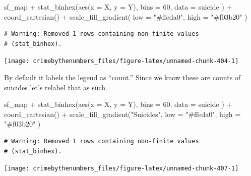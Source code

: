 \documentclass[
  a4paper,
]{krantz}
\makeatletter
\newenvironment{Shaded}{\begin{snugshade}}{\end{snugshade}}
\newcommand{\AttributeTok}[1]{\textcolor[rgb]{0.61,0.61,0.61}{#1}}
\newcommand{\DecValTok}[1]{\textcolor[rgb]{0.06,0.06,0.06}{#1}}
\newcommand{\FunctionTok}[1]{\textcolor[rgb]{0,0,0}{#1}}
\newcommand{\NormalTok}[1]{#1}
\newcommand{\SpecialCharTok}[1]{\textcolor[rgb]{0,0,0}{#1}}
\newcommand{\StringTok}[1]{\textcolor[rgb]{0.5,0.5,0.5}{#1}}
\newenvironment{kframe}{%
\medskip{}
\setlength{\fboxsep}{.8em}
 \def\at@end@of@kframe{}%
 \ifinner\ifhmode%
  \def\at@end@of@kframe{\end{minipage}}%
  \begin{minipage}{\columnwidth}%
 \fi\fi%
 \def\FrameCommand##1{\hskip\@totalleftmargin \hskip-\fboxsep
 \colorbox{shadecolor}{##1}\hskip-\fboxsep
     \hskip-\linewidth \hskip-\@totalleftmargin \hskip\columnwidth}%
 \MakeFramed {\advance\hsize-\width
   \@totalleftmargin\z@ \linewidth\hsize
   \@setminipage}}%
 {\par\unskip\endMakeFramed%
 \at@end@of@kframe}
\renewenvironment{Shaded}{\begin{kframe}}{\end{kframe}}
\makeatother
\begin{document}
\begin{Shaded}
\begin{Highlighting}[]
\NormalTok{sf\_map }\SpecialCharTok{+}
  \FunctionTok{stat\_binhex}\NormalTok{(}\FunctionTok{aes}\NormalTok{(}\AttributeTok{x =}\NormalTok{ X, }\AttributeTok{y =}\NormalTok{ Y),}
    \AttributeTok{bins =} \DecValTok{60}\NormalTok{,}
    \AttributeTok{data =}\NormalTok{ suicide}
\NormalTok{  ) }\SpecialCharTok{+}
  \FunctionTok{coord\_cartesian}\NormalTok{() }\SpecialCharTok{+}
  \FunctionTok{scale\_fill\_gradient}\NormalTok{(}
    \AttributeTok{low =} \StringTok{"\#ffeda0"}\NormalTok{,}
    \AttributeTok{high =} \StringTok{"\#f03b20"}
\NormalTok{  )}
\end{Highlighting}
\end{Shaded}

\begin{verbatim}
# Warning: Removed 1 rows containing non-finite values
# (stat_binhex).
\end{verbatim}

\begin{center}\texttt{[image: crimebythenumbers\_files/figure-latex/unnamed-chunk-404-1]} \end{center}

By default it labels the legend as ``count.'' Since we know
these are counts of suicides let's relabel that as such.

\begin{Shaded}
\begin{Highlighting}[]
\NormalTok{sf\_map }\SpecialCharTok{+}
  \FunctionTok{stat\_binhex}\NormalTok{(}\FunctionTok{aes}\NormalTok{(}\AttributeTok{x =}\NormalTok{ X, }\AttributeTok{y =}\NormalTok{ Y),}
    \AttributeTok{bins =} \DecValTok{60}\NormalTok{,}
    \AttributeTok{data =}\NormalTok{ suicide}
\NormalTok{  ) }\SpecialCharTok{+}
  \FunctionTok{coord\_cartesian}\NormalTok{() }\SpecialCharTok{+}
  \FunctionTok{scale\_fill\_gradient}\NormalTok{(}\StringTok{"Suicides"}\NormalTok{,}
    \AttributeTok{low =} \StringTok{"\#ffeda0"}\NormalTok{,}
    \AttributeTok{high =} \StringTok{"\#f03b20"}
\NormalTok{  )}
\end{Highlighting}
\end{Shaded}

\begin{verbatim}
# Warning: Removed 1 rows containing non-finite values
# (stat_binhex).
\end{verbatim}

\begin{center}\texttt{[image: crimebythenumbers\_files/figure-latex/unnamed-chunk-407-1]} \end{center}
\end{document}
